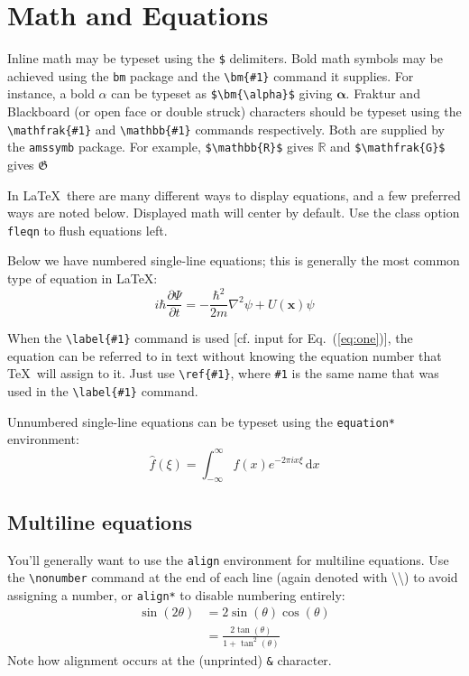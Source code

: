 \documentclass[]{article}
\begin{document}
\section{Math and Equations}
Inline math may be typeset using the \verb+$+ delimiters. Bold math symbols may be achieved using the \verb+bm+ package and the \verb+\bm{#1}+ command it supplies. For instance, a bold $\alpha$ can be typeset as \verb+$\bm{\alpha}$+ giving $\bm{\alpha}$. Fraktur and Blackboard (or open face or double struck) characters should be typeset using the \verb+\mathfrak{#1}+ and \verb+\mathbb{#1}+ commands respectively. Both are supplied by the \texttt{amssymb} package. For
example, \verb+$\mathbb{R}$+ gives $\mathbb{R}$ and \verb+$\mathfrak{G}$+ gives $\mathfrak{G}$

In \LaTeX\ there are many different ways to display equations, and a few preferred ways are noted below. Displayed math will center by default. Use the class option \verb+fleqn+ to flush equations left.

Below we have numbered single-line equations; this is generally the most common type of equation in \LaTeX: 
\begin{equation} 
\label{eq:one} %
  i \hbar \frac{\partial \Psi}{\partial t} = -\frac{\hbar^2}{2m}\nabla^2 \psi + U(\mathbf{x}) \psi
\end{equation}

When the \verb+\label{#1}+ command is used [cf. input for Eq.~(\ref{eq:one})], the equation can be referred to in text without knowing the equation number that \TeX\ will assign to it. Just use \verb+\ref{#1}+, where \verb+#1+ is the same name that was used in the \verb+\label{#1}+ command.

Unnumbered single-line equations can be typeset using the \verb+equation*+ environment:
\begin{equation*}
  \hat{f}(\xi) = \int_{-\infty}^\infty f(x) e^{-2\pi i x \xi} \, \mathrm{d}x
\end{equation*}

\subsection{Multiline equations}

You'll generally want to use the \verb+align+ environment for multiline equations. Use the \verb+\nonumber+ command at the end of each line (again denoted with \textbackslash\textbackslash) to avoid assigning a number, or \verb+align*+ to disable numbering entirely:
\begin{align}
  \sin(2\theta) &= 2 \sin(\theta) \cos(\theta) \nonumber \\
                &= \frac{2\tan(\theta)}{1 + \tan^2(\theta)}
\end{align}
Note how alignment occurs at the (unprinted) \verb+&+ character.
\end{document}
